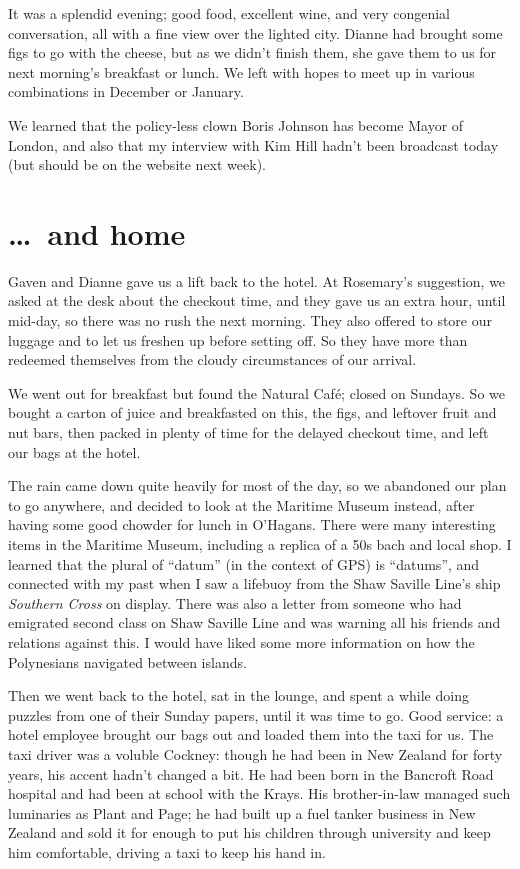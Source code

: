\documentclass[12pt,a4paper]{article}
\begin{document}
It was a splendid evening; good food, excellent wine, and very congenial
conversation, all with a fine view over the lighted city. Dianne had
brought some figs to go with the cheese, but as we didn't finish them, she
gave them to us for next morning's breakfast or lunch. We left with hopes to
meet up in various combinations in December or January.

We learned that the policy-less clown Boris Johnson has become Mayor of
London, and also that my interview with Kim Hill hadn't been broadcast today
(but should be on the website next week).

\section{\dots\ and home}

Gaven and Dianne gave us a lift back to the hotel. At Rosemary's suggestion,
we asked at the desk about the checkout time, and they gave us an extra hour,
until mid-day, so there was no rush the next morning. They also offered to
store our luggage and to let us freshen up before setting off. So they have
more than redeemed themselves from the cloudy circumstances of our arrival.

We went out for breakfast but found the Natural Caf\'e; closed on
Sundays. So we bought a carton of juice and breakfasted on this, the figs,
and leftover fruit and nut bars, then packed in plenty of time for the
delayed checkout time, and left our bags at the hotel.

The rain came down quite heavily for most of the day, so we abandoned our
plan to go anywhere, and decided to look at the Maritime Museum instead,
after having some good chowder for lunch in O'Hagans. There were many
interesting items in the Maritime Museum, including a replica of a 50s bach
and local shop. I learned that the plural of ``datum'' (in the context of GPS)
is ``datums'', and connected with my past when I saw a lifebuoy from the
Shaw Saville Line's ship \textit{Southern Cross} on display. 
There was also a letter
from someone who had emigrated second class on Shaw Saville Line and was
warning all his friends and relations against this. I would have liked some
more information on how the Polynesians navigated between islands.

Then we went back to the hotel, sat in the lounge, and spent a while doing
puzzles from one of their Sunday papers, until it was time to go. Good
service: a hotel employee brought our bags out and loaded them into the taxi
for us. The taxi driver was a voluble Cockney: though he had been in
New Zealand for forty years, his accent hadn't changed a bit. He had been
born in the Bancroft Road hospital and had been at school with the Krays.
His brother-in-law managed such luminaries as Plant and Page; he had built
up a fuel tanker business in New Zealand and sold it for enough to put his
children through university and keep him comfortable, driving a taxi to
keep his hand in.
\end{document}
